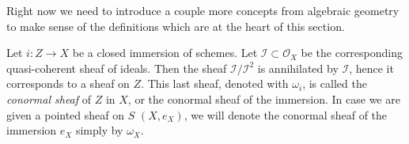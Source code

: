 \noindent
Right now we need to introduce a couple more concepts from algebraic
geometry to make sense of the definitions which are at the heart of this section.
%


\begin{defn}
	Let $i\colon Z \to X$ be a closed immersion of schemes.
	Let $\mathcal{I} \subset \mathcal{O}_X$ be the corresponding
	quasi-coherent sheaf of ideals.
	Then the sheaf $\mathcal{I}/\mathcal{I}^2$ is annihilated by $\mathcal{I}$,
	hence it corresponds to a sheaf on $Z$.
	This last sheaf, denoted with $\omega_i$, is called the {\em conormal
	sheaf} of $Z$ in $X$, or the conormal sheaf of the immersion.
	In case we are given a pointed sheaf on $S$ $\left(X, e_X\right)$, we will denote 
	the conormal sheaf of the immersion $e_X$ simply by
	$\omega_X$.
\end{defn}


